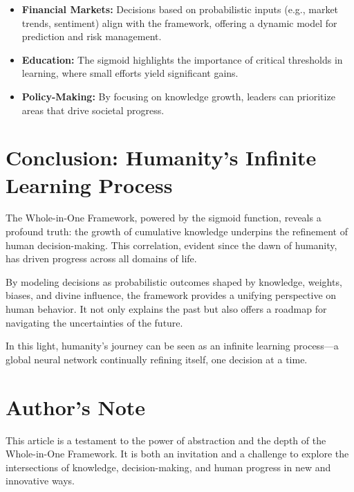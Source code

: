 \documentclass[a4]{article}
\newcommand{\bn}{\bigskip\noindent}
\begin{document}
\begin{itemize}
\item  {\bf Financial Markets:}  Decisions based on probabilistic inputs (e.g., market trends, sentiment) align with the framework, offering a dynamic model for prediction and risk management.
\item {\bf Education:}  The sigmoid highlights the importance of critical thresholds in learning, where small efforts yield significant gains.
\item {\bf Policy-Making:}  By focusing on knowledge growth, leaders can prioritize areas that drive societal progress.
\end{itemize}


\section{Conclusion: Humanity's Infinite Learning Process}

The Whole-in-One Framework, powered by the sigmoid function, reveals a profound truth: the growth of cumulative knowledge underpins the refinement of human decision-making. This correlation, evident since the dawn of humanity, has driven progress across all domains of life.

\bn
By modeling decisions as probabilistic outcomes shaped by knowledge, weights, biases, and divine influence, the framework provides a unifying perspective on human behavior. It not only explains the past but also offers a roadmap for navigating the uncertainties of the future.

\bn
In this light, humanity's journey can be seen as an infinite learning process---a global neural network continually refining itself, one decision at a time.



\section*{Author's Note}

This article is a testament to the power of abstraction and the depth of the Whole-in-One Framework. It is both an invitation and a challenge to explore the intersections of knowledge, decision-making, and human progress in new and innovative ways.
\end{document}
